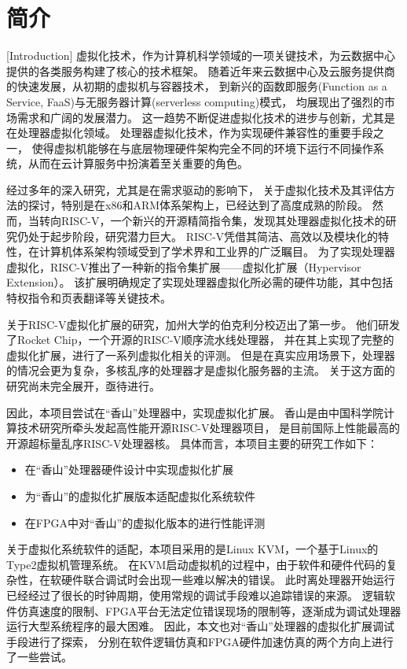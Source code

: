 \chapter{简介}[Introduction]
虚拟化技术，作为计算机科学领域的一项关键技术，为云数据中心提供的各类服务构建了核心的技术框架。
随着近年来云数据中心及云服务提供商的快速发展，从初期的虚拟机与容器技术，
到新兴的函数即服务(Function as a Service, FaaS)与无服务器计算(serverless computing)模式，
均展现出了强烈的市场需求和广阔的发展潜力。
这一趋势不断促进虚拟化技术的进步与创新，尤其是在处理器虚拟化领域。
处理器虚拟化技术，作为实现硬件兼容性的重要手段之一，
使得虚拟机能够在与底层物理硬件架构完全不同的环境下运行不同操作系统，从而在云计算服务中扮演着至关重要的角色。

经过多年的深入研究，尤其是在需求驱动的影响下，
关于虚拟化技术及其评估方法的探讨，特别是在x86和ARM体系架构上，已经达到了高度成熟的阶段。
然而，当转向RISC-V，一个新兴的开源精简指令集，发现其处理器虚拟化技术的研究仍处于起步阶段，研究潜力巨大。
RISC-V凭借其简洁、高效以及模块化的特性，在计算机体系架构领域受到了学术界和工业界的广泛瞩目。
为了实现处理器虚拟化，RISC-V推出了一种新的指令集扩展——虚拟化扩展（Hypervisor Extension）。
该扩展明确规定了实现处理器虚拟化所必需的硬件功能，其中包括特权指令和页表翻译等关键技术。

关于RISC-V虚拟化扩展的研究，加州大学的伯克利分校迈出了第一步。
他们研发了Rocket Chip，一个开源的RISC-V顺序流水线处理器，
并在其上实现了完整的虚拟化扩展，进行了一系列虚拟化相关的评测。
但是在真实应用场景下，处理器的情况会更为复杂，多核乱序的处理器才是虚拟化服务器的主流。
关于这方面的研究尚未完全展开，亟待进行。

因此，本项目尝试在“香山”处理器中，实现虚拟化扩展。
香山是由中国科学院计算技术研究所牵头发起高性能开源RISC-V处理器项目，
是目前国际上性能最高的开源超标量乱序RISC-V处理器核。
具体而言，本项目主要的研究工作如下：

\begin{itemize}
\item 在“香山”处理器硬件设计中实现虚拟化扩展
\item 为“香山”的虚拟化扩展版本适配虚拟化系统软件
\item 在FPGA中对“香山”的虚拟化版本的进行性能评测
\end{itemize}

关于虚拟化系统软件的适配，本项目采用的是Linux KVM，一个基于Linux的Type2虚拟机管理系统。
在KVM启动虚拟机的过程中，由于软件和硬件代码的复杂性，在软硬件联合调试时会出现一些难以解决的错误。
此时离处理器开始运行已经经过了很长的时钟周期，使用常规的调试手段难以追踪错误的来源。
逻辑软件仿真速度的限制、FPGA平台无法定位错误现场的限制等，逐渐成为调试处理器运行大型系统程序的最大困难。
因此，本文也对“香山”处理器的虚拟化扩展调试手段进行了探索，
分别在软件逻辑仿真和FPGA硬件加速仿真的两个方向上进行了一些尝试。